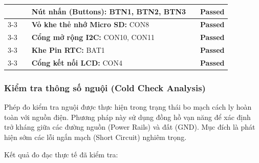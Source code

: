 \begin{longtable}{|c|p{}|p{}|p{}|c|}
                    & & \textbf{Nút nhấn (Buttons):} BTN1, BTN2, BTN3
                    & & \textcolor{modern_blue}{\textbf{Passed}} \\ \cline{3-3} \cline{5-5}
            
                    & & \textbf{Vỏ khe thẻ nhớ Micro SD:} CON8
                    & & \textcolor{modern_blue}{\textbf{Passed}} \\ \cline{3-3} \cline{5-5}
            
                    & & \textbf{Cổng mở rộng I2C:} CON10, CON11
                    & & \textcolor{modern_blue}{\textbf{Passed}} \\ \cline{3-3} \cline{5-5}
            
                    & & \textbf{Khe Pin RTC:} BAT1
                    & & \textcolor{modern_blue}{\textbf{Passed}} \\ \cline{3-3} \cline{5-5}
            
                    & & \textbf{Cổng kết nối LCD:} CON4
                    & & \textcolor{modern_blue}{\textbf{Passed}} \\ \hline
            \end{longtable}

        \subsubsection{Kiểm tra thông số nguội (Cold Check Analysis)}
            Phép đo kiểm tra nguội được thực hiện trong trạng thái bo mạch cách ly hoàn toàn với nguồn điện. Phương pháp này sử dụng đồng hồ vạn năng để xác định trở kháng giữa các đường nguồn (Power Rails) và đất (GND). Mục đích là phát hiện sớm các lỗi ngắn mạch (Short Circuit) nghiêm trọng.

            Kết quả đo đạc thực tế đã kiểm tra:

